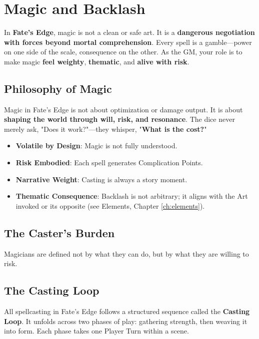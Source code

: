 \chapter{Magic and Backlash}

In \textbf{Fate's Edge}, magic is not a clean or safe art. It is a \textbf{dangerous negotiation with forces beyond mortal comprehension}. Every spell is a gamble---power on one side of the scale, consequence on the other. As the GM, your role is to make magic \textbf{feel weighty}, \textbf{thematic}, and \textbf{alive with risk}.

\section*{Philosophy of Magic}

Magic in Fate's Edge is not about optimization or damage output. It is about \textbf{shaping the world through will, risk, and resonance}. The dice never merely ask, "Does it work?"---they whisper, "\textbf{What is the cost?}"

\begin{itemize}
    \item \textbf{Volatile by Design}: Magic is not fully understood.
    \item \textbf{Risk Embodied}: Each spell generates Complication Points.
    \item \textbf{Narrative Weight}: Casting is always a story moment.
    \item \textbf{Thematic Consequence}: Backlash is not arbitrary; it aligns with the Art invoked or its opposite (see Elements, Chapter \ref{ch:elements}).
\end{itemize}

\section*{The Caster's Burden}

Magicians are defined not by what they can do, but by what they are willing to risk.

\section*{The Casting Loop}

All spellcasting in Fate's Edge follows a structured sequence called the \textbf{Casting Loop}. It unfolds across two phases of play: gathering strength, then weaving it into form. Each phase takes one Player Turn within a scene.

